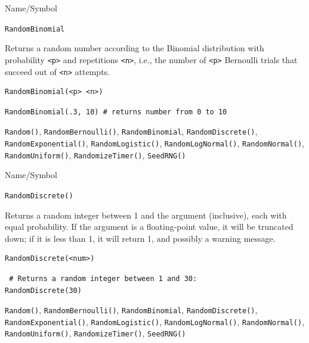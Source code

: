 \begin{desc}{Name/Symbol}
\item[Name/Symbol]	\verb+RandomBinomial+

\item[Description] Returns a random number according to the Binomial
  distribution with probability \verb+<p>+ and repetitions \verb+<n>+,
  i.e., the number of \verb+<p>+ Bernoulli trials that succeed out of
  \verb+<n>+ attempts.

\item[Usage]		
\begin{verbatim}
RandomBinomial(<p> <n>)  
\end{verbatim}

\item[Example]	
\begin{verbatim}
RandomBinomial(.3, 10) # returns number from 0 to 10
\end{verbatim}

\item[See Also]	\verb+Random()+, \verb+RandomBernoulli()+, \verb+RandomBinomial+,
		\verb+RandomDiscrete()+, \verb+RandomExponential()+, \verb+RandomLogistic()+,
		\verb+RandomLogNormal()+, \verb+RandomNormal()+, \verb+RandomUniform()+,    
		\verb+RandomizeTimer()+, \verb+SeedRNG()+    
\end{desc}

\begin{desc}{Name/Symbol}
\item[Name/Symbol]	\verb+RandomDiscrete()+

\item[Description]	Returns a random integer between 1 and the argument 
		(inclusive), each with equal probability.  If the argument is 
		a floating-point value, it will be truncated down; if it is 
		less than 1, it will return 1, and possibly a warning message. 

\item[Usage]		
\begin{verbatim}
RandomDiscrete(<num>)
\end{verbatim}
         
\item[Example]	
\begin{verbatim}
 # Returns a random integer between 1 and 30:
RandomDiscrete(30)
\end{verbatim}

\item[See Also]	\verb+Random()+, \verb+RandomBernoulli()+, \verb+RandomBinomial+, 
		\verb+RandomDiscrete()+, \verb+RandomExponential()+, \verb+RandomLogistic()+,
		\verb+RandomLogNormal()+, \verb+RandomNormal()+, \verb+RandomUniform()+,
		\verb+RandomizeTimer()+, \verb+SeedRNG()+    
\end{desc}

